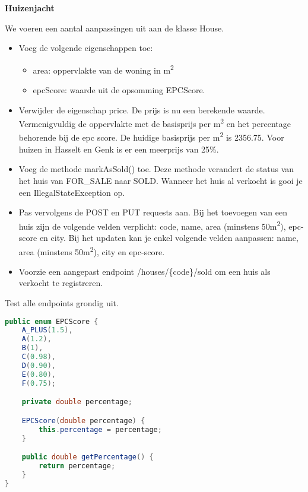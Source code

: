 \begin{oefening}
\textbf{Huizenjacht}

We voeren een aantal aanpassingen uit aan de klasse House.
\begin{itemize}
\item Voeg de volgende eigenschappen toe:
\begin{itemize}
\item area: oppervlakte van de woning in m\textsuperscript{2}
\item epcScore: waarde uit de opsomming EPCScore.
\end{itemize}
\item Verwijder de eigenschap price. De prijs is nu een berekende waarde. Vermenigvuldig de oppervlakte met de basisprijs per m\textsuperscript{2} en het percentage behorende bij de epc score.
De huidige basisprijs per m\textsuperscript{2} is 2356.75.  Voor huizen in Hasselt en Genk is er een meerprijs van 25\%. 
\item Voeg de methode markAsSold() toe.  Deze methode verandert de status van het huis van FOR\_SALE naar SOLD. Wanneer het huis al verkocht is gooi je een IllegalStateException op.
\item Pas vervolgens de POST en PUT requests aan. Bij het toevoegen van een huis zijn de volgende velden verplicht: code, name, area (minstens 50m\textsuperscript{2}), epc-score en city. 
Bij het updaten kan je enkel volgende velden aanpassen: name, area (minstens 50m\textsuperscript{2}), city en epc-score.
\item Voorzie een aangepast endpoint /houses/\{code\}/sold om een huis als verkocht te registreren.
\end{itemize}

Test alle endpoints grondig uit.

\begin{lstlisting}[language=java]
public enum EPCScore {
	A_PLUS(1.5),
	A(1.2),
	B(1),
	C(0.98),
	D(0.90),
	E(0.80),
	F(0.75);

	private double percentage;

	EPCScore(double percentage) {
		this.percentage = percentage;
	}

	public double getPercentage() {
		return percentage;
	}
}
\end{lstlisting}

\end{oefening}

